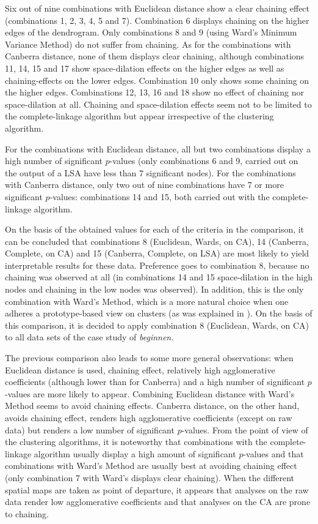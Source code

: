 Six out of nine combinations with Euclidean distance show a clear chaining effect (combinations 1, 2, 3, 4, 5 and 7). Combination 6 displays chaining on the higher edges of the dendrogram. Only combinations 8 and 9 (using Ward’s Minimum Variance Method) do not suffer from chaining. As for the combinations with Canberra distance, none of them displays clear chaining, although combinations 11, 14, 15 and 17 show space-dilation effects on the higher edges as well as chaining-effects on the lower edges. Combination 10 only shows some chaining on the higher edges. Combinations 12, 13, 16 and 18 show no effect of chaining nor space-dilation at all. Chaining and space-dilation effects seem not to be limited to the complete-linkage algorithm but appear irrespective of the clustering algorithm.

For the combinations with Euclidean distance, all but two combinations display a high number of significant $p$-values (only combinations 6 and 9, carried out on the output of a LSA have less than 7 significant nodes). For the combinations with Canberra distance, only two out of nine combinations have 7 or more significant $p$-values: combinations 14 and 15, both carried out with the complete-linkage algorithm.\largerpage

On the basis of the obtained values for each of the criteria in the comparison, it can be concluded that combinations 8 (Euclidean, Wards, on CA), 14 (Canberra, Complete, on CA) and 15 (Canberra, Complete, on LSA) are most likely to yield interpretable results for these data. Preference goes to combination 8, because no chaining was observed at all (in combinations 14 and 15 space-dilation in the high nodes and chaining in the low nodes was observed). In addition, this is the only combination with Ward’s Method, which is a more natural choice when one adheres a prototype-based view on clusters (as was explained in ). On the basis of this comparison, it is decided to apply combination 8 (Euclidean, Wards, on CA) to all data sets of the case study of \textit{beginnen.}

The previous comparison also leads to some more general observations: when Euclidean distance is used, chaining effect, relatively high agglomerative coefficients (although lower than for Canberra) and a high number of significant $p$-values are more likely to appear. Combining Euclidean distance with Ward’s Method seems to avoid chaining effects. Canberra distance, on the other hand, avoids chaining effect, renders high agglomerative coefficients (except on raw data) but renders a low number of significant $p$-values. From the point of view of the clustering algorithms, it is noteworthy that combinations with the complete-linkage algorithm usually display a high amount of significant $p$-values and that combinations with Ward’s Method are usually best at avoiding chaining effect (only combination 7 with Ward’s displays clear chaining). When the different spatial maps are taken as point of departure, it appears that analyses on the raw data render low agglomerative coefficients and that analyses on the CA are prone to chaining.\largerpage

